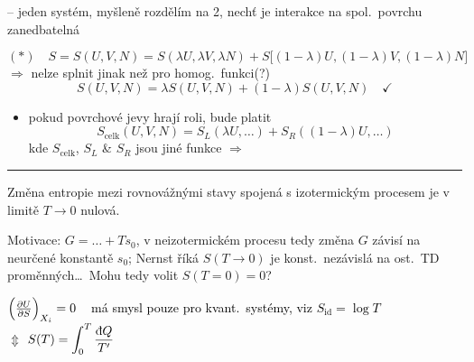 \begin{priklad}[Př.\ 2]
\begin{minipage}{0.5\textwidth}
\end{minipage}
\begin{minipage}{0.48\textwidth}
-- jeden systém, myšleně rozdělím na 2, nechť je interakce na spol.\ povrchu zanedbatelná
\end{minipage}
\[
  (*)\quad S = S(U,V,N) = S(\lambda U,\lambda V,\lambda N) + S\big[(1-\lambda)U,(1-\lambda)V,(1-\lambda)N\big]
\]
$\Rightarrow$ nelze splnit jinak než pro homog.\ funkci(?)
\[ S(U,V,N) = \lambda S(U,V,N) + (1-\lambda)S(U,V,N) \quad\checkmark \]
\begin{itemize}[nosep]
  \item pokud povrchové jevy hrají roli, bude platit
  \[ S_{\text{celk}}(U,V,N) = S_L(\lambda U,\dots) + S_R((1-\lambda)U,\dots) \]
  kde $S_{\text{celk}}$, $S_L$ \& $S_R$ jsou jiné funkce $\Rightarrow$ 
\end{itemize}
\end{priklad}
\noindent\rule{\linewidth}{0.4pt}

\begin{veta}[Postulát 5]
\textcolor{NavyBlue}{Změna entropie mezi rovnovážnými stavy spojená s izotermickým procesem je v limitě $T\to 0$ nulová.}
\end{veta}
\begin{minipage}{0.55\textwidth}\small
Motivace: $G = \dots + T s_0$, v neizotermickém procesu tedy změna $G$ závisí na neurčené konstantě $s_0$; Nernst říká $S(T\to 0)$ je konst.\ nezávislá na ost.\ TD proměnných\dots\ Mohu tedy volit $S(T=0) = 0$?
\end{minipage}
\begin{minipage}{0.43\textwidth}\color{NavyBlue}
$\Big(\pdv{U}{S}\Big)_{X_i} = 0$ \ \textcolor{black}{\pozor{!} má smysl pouze pro kvant.\ systémy, viz $S_{\text{id}} = \log T$ \pozor{!}} \\
\quad$\Updownarrow$ \quad $S(T) = \displaystyle\int_0^T\frac{\dbar Q}{T'}$
\end{minipage}

